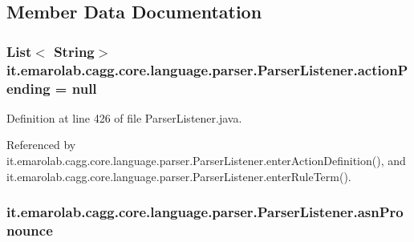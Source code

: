 \subsection{Member Data Documentation}
\hypertarget{classit_1_1emarolab_1_1cagg_1_1core_1_1language_1_1parser_1_1ParserListener_a01ae9f259d67cd1802123a15664fb21d}{
\subsubsection[{action\-Pending}]{\setlength{\rightskip}{0pt plus 5cm}List$<$ String$>$ it.\-emarolab.\-cagg.\-core.\-language.\-parser.\-Parser\-Listener.\-action\-Pending = null\hspace{0.3cm}{\ttfamily [private]}}}\label{classit_1_1emarolab_1_1cagg_1_1core_1_1language_1_1parser_1_1ParserListener_a01ae9f259d67cd1802123a15664fb21d}


Definition at line 426 of file Parser\-Listener.\-java.



Referenced by it.\-emarolab.\-cagg.\-core.\-language.\-parser.\-Parser\-Listener.\-enter\-Action\-Definition(), and it.\-emarolab.\-cagg.\-core.\-language.\-parser.\-Parser\-Listener.\-enter\-Rule\-Term().

\hypertarget{classit_1_1emarolab_1_1cagg_1_1core_1_1language_1_1parser_1_1ParserListener_a1c88e6e14fbaa021d592996c713bd2d7}{
\subsubsection[{asn\-Pronounce}]{ it.\-emarolab.\-cagg.\-core.\-language.\-parser.\-Parser\-Listener.\-asn\-Pronounce\hspace{0.3cm}{\ttfamily [private]}}}\label{classit_1_1emarolab_1_1cagg_1_1core_1_1language_1_1parser_1_1ParserListener_a1c88e6e14fbaa021d592996c713bd2d7}


